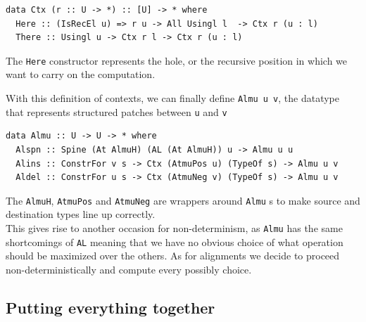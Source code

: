 \documentclass[11pt, titlepage]{article}
\newcommand{\toHaskell}[1]{\texttt{#1}\xspace}
\begin{document}
\begin{verbatim}
data Ctx (r :: U -> *) :: [U] -> * where
  Here :: (IsRecEl u) => r u -> All Usingl l  -> Ctx r (u : l)
  There :: Usingl u -> Ctx r l -> Ctx r (u : l)
\end{verbatim}

The \toHaskell{Here} constructor represents the hole, or the recursive position in which we want to carry on the computation. 

With this definition of contexts, we can finally define \toHaskell{Almu u v}, the datatype that represents structured patches between \toHaskell{u} and \toHaskell{v}

\begin{verbatim}
data Almu :: U -> U -> * where
  Alspn :: Spine (At AlmuH) (AL (At AlmuH)) u -> Almu u u
  Alins :: ConstrFor v s -> Ctx (AtmuPos u) (TypeOf s) -> Almu u v
  Aldel :: ConstrFor u s -> Ctx (AtmuNeg v) (TypeOf s) -> Almu u v
\end{verbatim}

The \toHaskell{AlmuH}, \toHaskell{AtmuPos} and \toHaskell{AtmuNeg} are wrappers around \toHaskell{Almu}s to make source and destination types line up correctly.
\\
This gives rise to another occasion for non-determinism, as \texttt{Almu} has 
the same shortcomings of \texttt{AL} meaning that we have no obvious choice of 
what operation should be maximized over the others. As for alignments we decide to proceed non-deterministically
and compute every possibly choice. 

\subsection{Putting everything together}\label{putting everything together}
\end{document}
